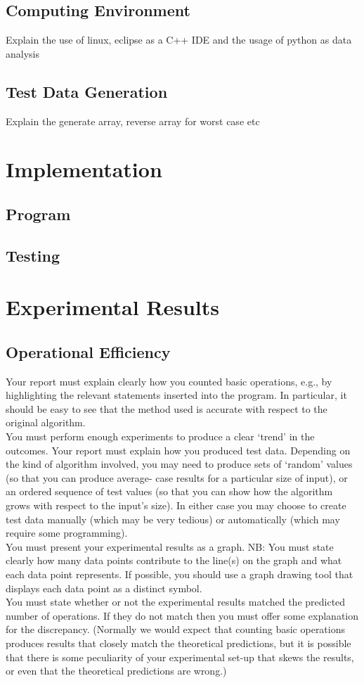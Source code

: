 \documentclass[]{article}
\begin{document}
\subsection{Computing Environment}
Explain the use of linux, eclipse as a C++ IDE and the usage of python as data analysis
\subsection{Test Data Generation}
Explain the generate array, reverse array for worst case etc
\section{Implementation}
\subsection{Program}
\subsection{Testing}
\section{Experimental Results}
\subsection{Operational Efficiency}
Your report must explain clearly how you counted basic operations, e.g., by highlighting the
relevant statements inserted into the program. In particular, it should be easy to see that the
method used is accurate with respect to the original algorithm.
\\
You must perform enough experiments to produce a clear ‘trend’ in the outcomes. Your
report must explain how you produced test data. Depending on the kind of algorithm
involved, you may need to produce sets of ‘random’ values (so that you can produce average-
case results for a particular size of input), or an ordered sequence of test values (so that you
can show how the algorithm grows with respect to the input’s size). In either case you may
choose to create test data manually (which may be very tedious) or automatically (which may
require some programming).
\\
You must present your experimental results as a graph. NB: You must state clearly how many
data points contribute to the line(s) on the graph and what each data point represents. If
possible, you should use a graph drawing tool that displays each data point as a distinct
symbol.
\\
You must state whether or not the experimental results matched the predicted number of
operations. If they do not match then you must offer some explanation for the discrepancy.
(Normally we would expect that counting basic operations produces results that closely match
the theoretical predictions, but it is possible that there is some peculiarity of your experimental
set-up that skews the results, or even that the theoretical predictions are wrong.)
\end{document}
